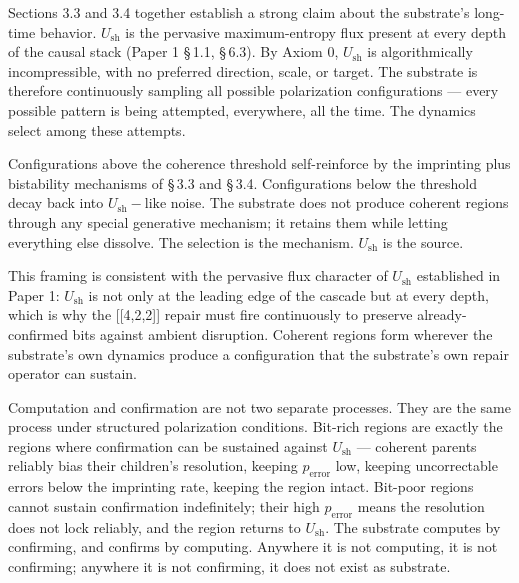 \documentclass[11pt,oneside]{report}
\theoremstyle{definition}
\theoremstyle{remark}
\begin{document}
Sections 3.3 and 3.4 together establish a strong claim about the
substrate's long-time behavior. \ensuremath{U_{\mathrm{sh}}} is the pervasive maximum-entropy
flux present at every depth of the causal stack (Paper 1 \S\,1.1, \S\,6.3). By
Axiom 0, \ensuremath{U_{\mathrm{sh}}} is algorithmically incompressible, with no preferred
direction, scale, or target. The substrate is therefore continuously
sampling all possible polarization configurations --- every possible
pattern is being attempted, everywhere, all the time. The dynamics
select among these attempts.

Configurations above the coherence threshold self-reinforce by the
imprinting plus bistability mechanisms of \S\,3.3 and \S\,3.4. Configurations
below the threshold decay back into \ensuremath{U_{\mathrm{sh}}-\text{like}} noise. The substrate does
not produce coherent regions through any special generative mechanism;
it retains them while letting everything else dissolve. The selection is
the mechanism. \ensuremath{U_{\mathrm{sh}}} is the source.

This framing is consistent with the pervasive flux character of \ensuremath{U_{\mathrm{sh}}}
established in Paper 1: \ensuremath{U_{\mathrm{sh}}} is not only at the leading edge of the
cascade but at every depth, which is why the [[4,2,2]] repair
must fire continuously to preserve already-confirmed bits against
ambient disruption. Coherent regions form wherever the substrate's own
dynamics produce a configuration that the substrate's own repair
operator can sustain.

Computation and confirmation are not two separate processes. They are
the same process under structured polarization conditions. Bit-rich
regions are exactly the regions where confirmation can be sustained
against \ensuremath{U_{\mathrm{sh}}} --- coherent parents reliably bias their children's
resolution, keeping \ensuremath{p_{\mathrm{error}}} low, keeping uncorrectable errors below the
imprinting rate, keeping the region intact. Bit-poor regions cannot
sustain confirmation indefinitely; their high \ensuremath{p_{\mathrm{error}}} means the
resolution does not lock reliably, and the region returns to \ensuremath{U_{\mathrm{sh}}.} The
substrate computes by confirming, and confirms by computing. Anywhere it
is not computing, it is not confirming; anywhere it is not confirming,
it does not exist as substrate.
\end{document}
